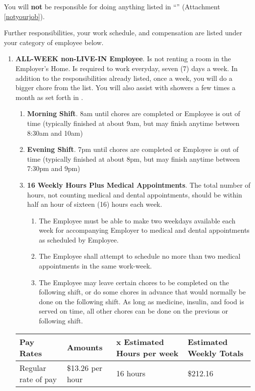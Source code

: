 \documentclass[]{article}
\newcommand{\sw}{.15\textwidth}
\newcommand{\bw}{.39\textwidth}
\newcommand{\allweek}{ALL-WEEK non-LIVE-IN Employee}
\begin{document}
You will \textbf{not} be responsible for doing anything listed in ``\notyourjob{}'' (Attachment \ref{notyourjob}). 

Further responsibilities, your work schedule, and compensation are listed under your category of employee below.
\begin{enumerate}
	\item \textbf{\allweek{}}. \label{allweek}
		Is not renting a room in the Employer's Home. Is required to work everyday, seven (7) days a week. In addition to the responsibilities already listed, once a week, you will do a bigger chore from the \bigchores{} list. You will also assist with showers a few times a month as set forth in \shower{}. 
		\begin{enumerate}
			\item \textbf{Morning Shift}. 8am until chores are completed or Employee is out of time (typically finished at about 9am, but may finish anytime between 8:30am and 10am)
			\item \textbf{Evening Shift}. 7pm until chores are completed or Employee is out of time (typically finished at about 8pm, but may finish anytime between 7:30pm and 9pm)
			\item \textbf{16 Weekly Hours Plus Medical Appointments}. The total number of hours, not counting medical and dental appointments, should be within half an hour of sixteen (16) hours each week. 
				\begin{enumerate}
					\item The Employee must be able to make two weekdays available each week for accompanying Employer to medical and dental appointments as scheduled by Employee.
					\item The Employee shall attempt to schedule no more than two medical appointments in the same work-week.
					\item The Employee may leave certain chores to be completed on the following shift, or do some chores in advance that would normally be done on the following shift. As long as medicine, insulin, and food is served on time, all other chores can be done on the previous or following shift.
				\end{enumerate}
		\end{enumerate}
		\begin{tabular}{|p{\bw}|p{\sw}|p{\sw}|p{\sw}|}
			\hline
			\rowcolor{medgray}
			Pay Rates & Amounts & x Estimated Hours per week & Estimated Weekly Totals\\ \hline
			Regular rate of pay & \$13.26 per hour & 16 hours & \$212.16\\ \hline

\end{tabular}
\end{enumerate}
\end{document}
